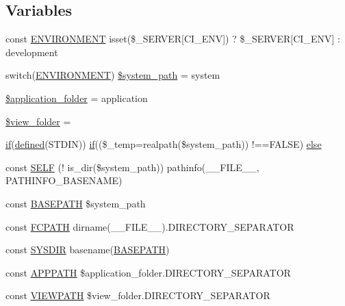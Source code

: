 \subsection*{Variables}
\begin{DoxyCompactItemize}
\item 
const \mbox{\hyperlink{index_8php_a8757a57d09df5349f8b93b2083e29a1e}{E\+N\+V\+I\+R\+O\+N\+M\+E\+NT}} isset(\$\+\_\+\+S\+E\+R\+V\+ER\mbox{[}\textquotesingle{}C\+I\+\_\+\+E\+NV\textquotesingle{}\mbox{]}) ? \$\+\_\+\+S\+E\+R\+V\+ER\mbox{[}\textquotesingle{}C\+I\+\_\+\+E\+NV\textquotesingle{}\mbox{]} \+: \textquotesingle{}development\textquotesingle{}
\item 
switch(\mbox{\hyperlink{index_8php_a8757a57d09df5349f8b93b2083e29a1e}{E\+N\+V\+I\+R\+O\+N\+M\+E\+NT}}) \mbox{\hyperlink{index_8php_af832b0c9a5014f0bb87496701ceb30e5}{\$system\+\_\+path}} = \textquotesingle{}system\textquotesingle{}
\item 
\mbox{\hyperlink{index_8php_ace4309eda0b92e3260b226079bc17909}{\$application\+\_\+folder}} = \textquotesingle{}application\textquotesingle{}
\item 
\mbox{\hyperlink{index_8php_a974fdae9fe36c7e07e82bb71ed42b6b3}{\$view\+\_\+folder}} = \textquotesingle{}\textquotesingle{}
\item 
\mbox{\hyperlink{_test_test_8php_a107bc088eea0dce8972b45c841f5ff9c}{if}}(\mbox{\hyperlink{password_8php_a74f41c0efe4435fb8ac2133464d3cd57}{defined}}(\textquotesingle{}S\+T\+D\+IN\textquotesingle{})) \mbox{\hyperlink{_test_test_8php_a107bc088eea0dce8972b45c841f5ff9c}{if}}((\$\+\_\+temp=realpath(\$system\+\_\+path)) !==F\+A\+L\+SE) \mbox{\hyperlink{index_8php_ad6d2150d853feb0a6cb32263b584e456}{else}}
\item 
const \mbox{\hyperlink{index_8php_a6f163f65a35aa02c02a5ff21337053d8}{S\+E\+LF}} (! is\+\_\+dir(\$system\+\_\+path)) pathinfo(\+\_\+\+\_\+\+F\+I\+L\+E\+\_\+\+\_\+, P\+A\+T\+H\+I\+N\+F\+O\+\_\+\+B\+A\+S\+E\+N\+A\+ME)
\item 
const \mbox{\hyperlink{index_8php_ad39801cabfd338dc5524466fe793fda9}{B\+A\+S\+E\+P\+A\+TH}} \$system\+\_\+path
\item 
const \mbox{\hyperlink{index_8php_ae486546e58b2603595efedf9f95b3926}{F\+C\+P\+A\+TH}} dirname(\+\_\+\+\_\+\+F\+I\+L\+E\+\_\+\+\_\+).D\+I\+R\+E\+C\+T\+O\+R\+Y\+\_\+\+S\+E\+P\+A\+R\+A\+T\+OR
\item 
const \mbox{\hyperlink{index_8php_ab645ae0961792b1f2b4b83f89cb95fa5}{S\+Y\+S\+D\+IR}} basename(\mbox{\hyperlink{index_8php_ad39801cabfd338dc5524466fe793fda9}{B\+A\+S\+E\+P\+A\+TH}})
\item 
const \mbox{\hyperlink{index_8php_a644e58bbe10b41e25c0768345587f4aa}{A\+P\+P\+P\+A\+TH}} \$application\+\_\+folder.\+D\+I\+R\+E\+C\+T\+O\+R\+Y\+\_\+\+S\+E\+P\+A\+R\+A\+T\+OR
\item 
const \mbox{\hyperlink{index_8php_ade8921d52af58583e5727833459224c3}{V\+I\+E\+W\+P\+A\+TH}} \$view\+\_\+folder.\+D\+I\+R\+E\+C\+T\+O\+R\+Y\+\_\+\+S\+E\+P\+A\+R\+A\+T\+OR
\end{DoxyCompactItemize}


